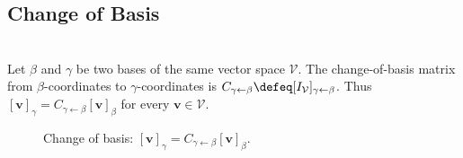 \subsection{Change of Basis}
\begin{definition} \\
Let $\beta$ and $\gamma$ be two bases of the same vector space $\mathcal{V}$. The change-of-basis matrix from $\beta$-coordinates to $\gamma$-coordinates is $C_{\gamma \leftarrow \beta} \defeq [I_{\mathcal{V}}]_{\gamma \leftarrow \beta}$. Thus $[\mathbf{v}]_{\gamma} = C_{\gamma \leftarrow \beta}[\mathbf{v}]_{\beta}$ for every $\mathbf{v} \in \mathcal{V}$.
\end{definition}

\begin{figure}[H]
  \centering
  
  \caption{Change of basis: $[\mathbf{v}]_{\gamma}=C_{\gamma\leftarrow\beta}[\mathbf{v}]_{\beta}$.}
  \label{fig:change-of-basis-coordinate-triangle}
\end{figure}

